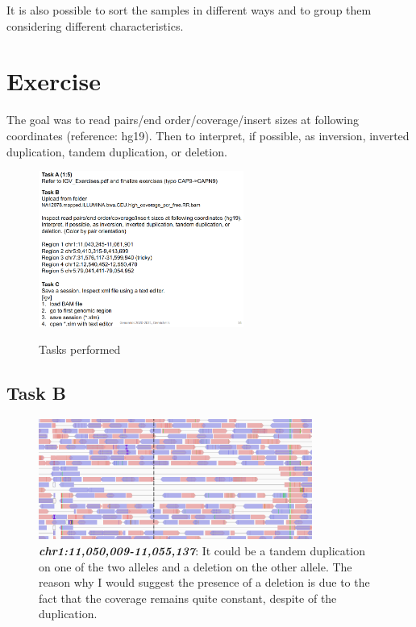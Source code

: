 It is also possible to sort the samples in different ways and to group them
considering different characteristics.


\section{Exercise}
The goal was to read pairs/end order/coverage/insert sizes at following
coordinates (reference: hg19). Then to interpret, if possible, as inversion, inverted duplication, tandem duplication, or deletion.

\begin{figure}[H]
  \centering
  \includegraphics[width=0.6\textwidth]{TasksClass.PNG}
  \label{fig: Tasks performed IGV}
  \caption{Tasks performed}
\end{figure}

\subsection{Task B}

\begin{figure}[H]
    \centering
    \includegraphics[width=0.8\textwidth]{pos1.PNG}
    \caption{\textit{\textbf{chr1:11,050,009-11,055,137}}: It could be a tandem
    duplication on one of the two alleles and a deletion on the other allele.
    The reason why I would suggest the presence of a deletion is due to the fact
    that the coverage remains quite constant, despite of the duplication.}
    \label{fig:task_B}
\end{figure}

